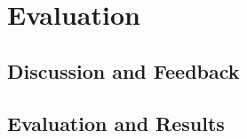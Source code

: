 \section{Evaluation}\label{sec:outcome}
\subsection{Discussion and Feedback}\label{subsec:feedback}
\subsection{Evaluation and Results}\label{subsec:evaluation}  


